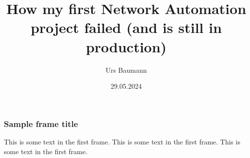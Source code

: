 \documentclass[aspectratio=169]{beamer}
\title{How my first Network Automation project failed (and is still in production)}
\author{Urs Baumann}
\institute{Swisscom}
\date{29.05.2024}
\begin{document}
\frame{\titlepage}

\begin{frame}
    \frametitle{Sample frame title}
    This is some text in the first frame. This is some text in the first frame. This is some text in the first frame.
\end{frame}
\end{document}
